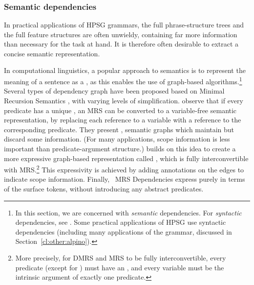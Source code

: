 \documentclass[output=paper,nonflat]{langsci/langscibook}
\begin{document}


\subsubsection{Semantic dependencies}
\label{cl:prac:dep}


In practical applications of HPSG grammars,
the full phrase-structure trees and the full feature structures are often unwieldy,
containing far more information than necessary for the task at hand.
It is therefore often desirable to extract a concise semantic representation.

In computational linguistics, a popular approach to semantics
is to represent the meaning of a sentence as a \textit{},
as this enables the use of graph-based algorithms.\footnote{%
	In this section, we are concerned with \emph{semantic} dependencies.
	For \emph{syntactic} dependencies, see .
	Some practical applications of HPSG use syntactic dependencies
	(including many applications of the  grammar, discussed in Section~\ref{cl:other:alpino}).
}
Several types of dependency graph have been proposed
based on Minimal Recursion Semantics \citep[MRS;][]{CFPS2005a},
with varying levels of simplification.
\citet{oepen2006eds} observe that if every predicate has a unique
\textit{}, an MRS can be converted to a variable-free semantic representation,
by replacing each reference to a variable with a reference to the corresponding predicate.
They present ,
semantic graphs which maintain  but discard some  information.
(For many applications, scope information is less important than predicate-argument structure.)
\citet{copestake2009dmrs} builds on this idea
to create a more expressive graph-based representation called
,
which is fully interconvertible with MRS.\footnote{%
	More precisely, for DMRS and MRS to be fully interconvertible,
	every predicate (except for ) must have an ,
	and every variable must be the intrinsic argument of exactly one predicate.
} This expressivity is achieved by adding annotations on the edges to
indicate scope information.
Finally, \delphin\ MRS Dependencies \citep[DM;][]{ivanova2012dm}
express  purely in terms of the surface tokens,
without introducing any abstract predicates.
\end{document}
